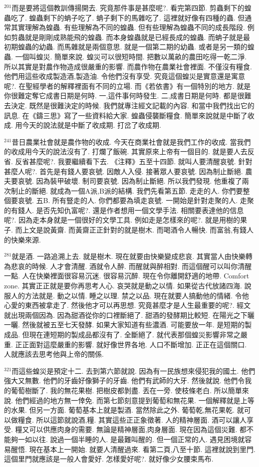 \documentclass{book}
\begin{document}
$^{201}$而是要將這個教訓傳揚開去.
究竟那件事是甚麼呢?.
看完第四節.
剪蟲剩下的蝗蟲吃了.
蝗蟲剩下的蚺子吃了.
蚺子剩下的馬雜吃了.
這裡就好像有四種的蟲.
但通常其實理解為蝗蟲.
有些理解為不同的蝗蟲.
但有些理解為蝗蟲不同的成長階段.
例如剪蟲就是剛剛成熟能飛的蝗蟲.
而本身蝗蟲就是已經長成的蝗蟲.
而蚺子就是最初期蝗蟲的幼蟲.
而馬雜就是兩個意思.
就是一個第二期的幼蟲.
或者是另一類的蝗蟲.
一個叫蝗災.
簡單來說.
蝗災可以很短時間.
把數以萬畝的農田吃得一乾二淨.
所以其實是對農作物造成很嚴重的影響.
而農作物在農業社會裡面.
不僅沒有糧食.
他們用這些收成製造酒,製造油.
令他們沒有享受.
究竟這個蝗災是實意還是寓意呢?.
在聖經學者的解釋裡面有不同的立場.
而《若依書》有一個特別的地方.
就是你很難定奪它成書日期是何時.
一,這件事何時發生.
二,成書日期是何時.
都是很難去決定.
既然是很難決定的時候.
我們就專注經文記載的內容.
和當中我們找出它的訊息.
在《鑄三思》寫了一些資料給大家.
蝗蟲侵襲斷糧食.
簡單來說就是中斷了收成.
用今天的說法就是中斷了收成期.
打岔了收成期.

$^{241}$昔日農業社會就是農作物的收成.
今天在商業社會就是我們工作的收成.
當我們的收成用今天的說法沒有了.
打爛了飯碗.
其實原來上帝有一個目的.
就是要人去反省.
反省甚麼呢?.
我要繼續看下去.
《注釋》五至十四節.
就叫人要清醒哀號.
針對甚麼人呢?.
首先是有錢人要哀號.
因敵人入侵.
接著眾人要哀號.
因為制止斷絕.
農夫要哀號.
因為裝甲破壞.
制司要哀號.
因為制止斷絕.
所以我們發現.
他重複了兩次制止的斷絕.
就成為一個A派,B派的結構.
我們先看第五節.
走走的人.
你們要整個要哀號.
五B.
所有豎走的人.
你們都要為填走哀號.
一開始是針對走聚的人.
走聚的有錢人.
是否先知仇富呢?.
還是作者想用一個文學手法.
相關要表達他的信息呢?.
因為走本身就是一個很好的文學工具.
例如走是怎樣來的呢?.
就是用樹的果子.
而上文是說黃齋.
而黃齋正正針對的就是樹木.
而喝酒令人暢快.
而富翁,有錢人的快樂來源.

$^{281}$就是酒.
一路追溯上去.
就是樹木.
現在就要由快樂變成悲哀.
其實當人由快樂轉為悲哀的時候.
人才會清醒.
酒就令人醉.
而醒就與醉相對.
而這個醒可以叫你清醒一點.
人在快樂裡面很容易沉迷.
很容易沉醉.
現在令你離開舒適的地帶.
Comfort zone.
其實正正就是要你再思考人心.
哀哭就是動之以情.
如果從古代放諸四海.
說服人的方法就是.
動之以情.
睡之以理.
禁之以品.
現在就要人搞動他的情緒.
令他心愛的東西被拿走了.
然後他才可以再思想.
究竟甚麼才是人生最重要的呢?.
經文就出現兩個因為.
因為甜酒從你的口裡斷絕了.
甜酒的發酵期比較短.
在陽光之下曬一曬.
然後就被五至七天發酵.
如果大家知道有些濃酒.
可能要放一年.
是短期的製成品.
但現在連短期的製成品都沒有了.
全斷絕了.
就代表那個蝗災影響非常之嚴重.
正正面對這麼嚴重的影響.
就好像世界各地.
人口不斷增加.
正正在這個關口.
人就應該去思考他與上帝的關係.

$^{321}$而這些蝗災是預定十二.
去到第六節就說.
因為有一民族想來侵犯我的國土.
他們強大又無數.
他們的牙齒好像獅子的牙齒.
他們有武師的大牙.
然後就說.
他們令我的葡萄樹斷了.
我的無花果樹.
把樹皮都剝盡.
丟在一旁.
使枝條老白.
所以簡單來說.
他們經過的地方無一倖免.
而第七節刻意提到葡萄和無花果.
一個解釋就是上等的水果.
但另一方面.
葡萄基本上就是製酒.
當然除此之外.
葡萄乾,無花果乾.
就可以做糧食.
所以這節就說酒,糧.
其實這些正正象徵著.
人的精神層面.
酒可以讓人享受.
糧又可以供應肉身的需要.
無論是精神層面,肉身層面.
現在因為這個災難.
都不能夠一如以往.
說過一個半睡的人.
是最難叫醒的.
但一個正常的人.
遇見困境就容易醒悟.
現在基本上一開始.
就要人清醒過來.
看第二頁,八至十節.
這裡就說到里門.
這個里門就應該是一般人會愛好.
怎樣愛好呢?.
就好像少女腰束馬布.
\end{document}
